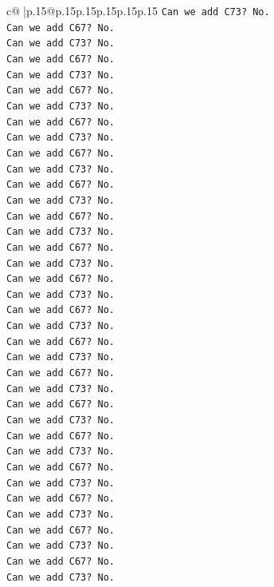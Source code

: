 \documentclass{article}
\begin{document}
{\begin{supertabular}{c@{$\;$}|p{.15\linewidth}@{}p{.15\linewidth}p{.15\linewidth}p{.15\linewidth}p{.15\linewidth}p{.15\linewidth}}
{{{\texttt{Can we add C73? No.} \\
\texttt{Can we add C67? No.} \\
\texttt{Can we add C73? No.} \\
\texttt{Can we add C67? No.} \\
\texttt{Can we add C73? No.} \\
\texttt{Can we add C67? No.} \\
\texttt{Can we add C73? No.} \\
\texttt{Can we add C67? No.} \\
\texttt{Can we add C73? No.} \\
\texttt{Can we add C67? No.} \\
\texttt{Can we add C73? No.} \\
\texttt{Can we add C67? No.} \\
\texttt{Can we add C73? No.} \\
\texttt{Can we add C67? No.} \\
\texttt{Can we add C73? No.} \\
\texttt{Can we add C67? No.} \\
\texttt{Can we add C73? No.} \\
\texttt{Can we add C67? No.} \\
\texttt{Can we add C73? No.} \\
\texttt{Can we add C67? No.} \\
\texttt{Can we add C73? No.} \\
\texttt{Can we add C67? No.} \\
\texttt{Can we add C73? No.} \\
\texttt{Can we add C67? No.} \\
\texttt{Can we add C73? No.} \\
\texttt{Can we add C67? No.} \\
\texttt{Can we add C73? No.} \\
\texttt{Can we add C67? No.} \\
\texttt{Can we add C73? No.} \\
\texttt{Can we add C67? No.} \\
\texttt{Can we add C73? No.} \\
\texttt{Can we add C67? No.} \\
\texttt{Can we add C73? No.} \\
\texttt{Can we add C67? No.} \\
\texttt{Can we add C73? No.} \\
\texttt{Can we add C67? No.} \\
\texttt{Can we add C73? No.} \\
}}}
\end{supertabular}}
\end{document}
